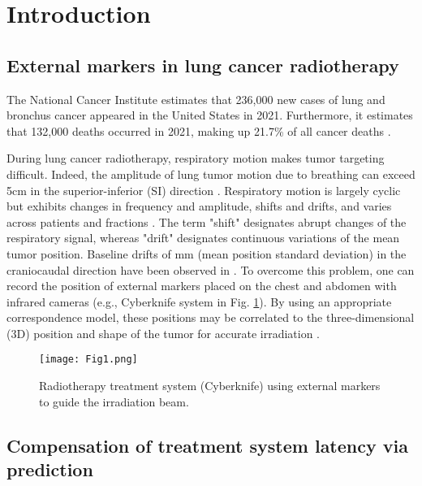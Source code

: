 \documentclass[twocolumn,a4paper]{svjour3} \sloppy          \smartqed
\begin{document}
\section{Introduction}

\subsection{External markers in lung cancer radiotherapy} 
\label{subs:external markers}

The National Cancer Institute estimates that 236,000 new cases of lung and bronchus cancer appeared in the United States in 2021. Furthermore, it estimates that 132,000 deaths occurred in 2021, making up 21.7\% of all cancer deaths \cite{NIC2020LungBronchusCancer}.   

During lung cancer radiotherapy, respiratory motion makes tumor targeting difficult. Indeed, the amplitude of lung tumor motion due to breathing can exceed 5cm in the superior-inferior (SI) direction \cite{sarudis2017systematic}. Respiratory motion is largely cyclic but exhibits changes in frequency and amplitude, shifts and drifts, and varies across patients and fractions \cite{verma2010survey, ehrhardt20134d}. The term "shift" designates abrupt changes of the respiratory signal, whereas "drift" designates continuous variations of the mean tumor position. Baseline drifts of  mm (mean position  standard deviation) in the craniocaudal direction have been observed in \cite{takao2016intrafractional}. To overcome this problem, one can record the position of external markers placed on the chest and abdomen with infrared cameras (e.g., Cyberknife system \cite{khankan2017demystifying} in Fig. \ref{fig:treatment system}). By using an appropriate correspondence model, these positions may be correlated to the three-dimensional (3D) position and shape of the tumor for accurate irradiation \cite{ehrhardt20134d, mcclelland2013respiratory}.

\begin{figure}[thb!]
\centering
\texttt{[image: Fig1.png]}
\caption{Radiotherapy treatment system (Cyberknife) using external markers to guide the irradiation beam\protect\footnotemark.} \label{fig:treatment system}
\end{figure}



\subsection{Compensation of treatment system latency via prediction}
\label{section:intro pred in radiotherapy}
\end{document}
